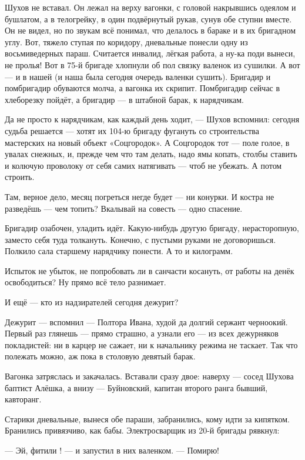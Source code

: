 Шухов не вставал. Он лежал на верху вагонки, с головой накрывшись одеялом и бушлатом, а в телогрейку, в один подвёрнутый рукав, сунув обе ступни вместе. Он не видел, но по звукам всё понимал, что делалось в бараке и в их бригадном углу. Вот, тяжело ступая по коридору, дневальные понесли одну из восьмиведерных параш. Считается инвалид, лёгкая работа, а ну-ка поди вынеси, не пролья! Вот в 75-й бригаде хлопнули об пол связку валенок из сушилки. А вот --- и в нашей (и наша была сегодня очередь валенки сушить). Бригадир и помбригадир обуваются молча, а вагонка их скрипит. Помбригадир сейчас в хлеборезку пойдёт, а бригадир --- в штабной барак, к нарядчикам.

Да не просто к нарядчикам, как каждый день ходит, --- Шухов вспомнил: сегодня судьба решается --- хотят их 104-ю бригаду фугануть со строительства мастерских на новый объект «Соцгородок». А Соцгородок тот --- поле голое, в увалах снежных, и, прежде чем что там делать, надо ямы копать, столбы ставить и колючую проволоку от себя самих натягивать --- чтоб не убежать. А потом строить.

Там, верное дело, месяц погреться негде будет --- ни конурки. И костра не разведёшь --- чем топить? Вкалывай на совесть --- одно спасение.

Бригадир озабочен, уладить идёт. Какую-нибудь другую бригаду, нерасторопную, заместо себя туда толкануть. Конечно, с пустыми руками не договоришься. Полкило сала старшему нарядчику понести. А то и килограмм.

Испыток не убыток, не попробовать ли в санчасти косануть, от работы на денёк освободиться? Ну прямо всё тело разнимает.

И ещё --- кто из надзирателей сегодня дежурит?

Дежурит --- вспомнил --- Полтора Ивана, худой да долгий сержант черноокий. Первый раз глянешь --- прямо страшно, а узнали его --- из всех дежурняков покладистей: ни в карцер не сажает, ни к начальнику режима не таскает. Так что полежать можно, аж пока в столовую девятый барак.

Вагонка затряслась и закачалась. Вставали сразу двое: наверху --- сосед Шухова баптист Алёшка, а внизу --- Буйновский, капитан второго ранга бывший, кавторанг.

Старики дневальные, вынеся обе параши, забранились, кому идти за кипятком. Бранились привязчиво, как бабы. Электросварщик из 20-й бригады рявкнул:

--- Эй, фитили ! --- и запустил в них валенком. --- Помирю!

